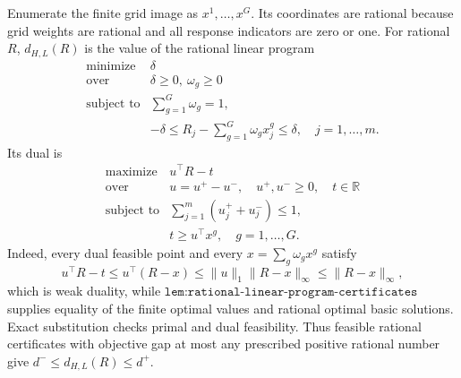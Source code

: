 Enumerate the finite grid image as \(x^1,\ldots,x^G\).  Its coordinates are rational because grid weights are rational and all response indicators are zero or one.  For rational \(R\), \(d_{H,L}(R)\) is the value of the rational linear program
\[
 \begin{array}{ll}
 \text{minimize}&\delta\\
 \text{over}&\delta\ge0,\ \omega_g\ge0\\
 \text{subject to}&\displaystyle\sum_{g=1}^G\omega_g=1,\\
 &\displaystyle-\delta\le R_j-\sum_{g=1}^G\omega_gx^g_j\le\delta,
 \quad j=1,\ldots,m.
 \end{array}
\]
Its dual is
\[
 \begin{array}{ll}
 \text{maximize}&u^\top R-t\\
 \text{over}&u=u^+-u^-,\quad u^+,u^-\ge0,\quad t\in\mathbb R\\
 \text{subject to}&\displaystyle\sum_{j=1}^m(u_j^++u_j^-)\le1,\\
 &t\ge u^\top x^g,\quad g=1,\ldots,G.
 \end{array}
\]
Indeed, every dual feasible point and every \(x=\sum_g\omega_gx^g\) satisfy
\[
 u^\top R-t\le u^\top(R-x)
 \le\|u\|_1\|R-x\|_\infty
 \le\|R-x\|_\infty,
\]
which is weak duality, while \(\texttt{lem:rational-linear-program-certificates}\) supplies equality of the finite optimal values and rational optimal basic solutions.  Exact substitution checks primal and dual feasibility.  Thus feasible rational certificates with objective gap at most any prescribed positive rational number give \(d^-\le d_{H,L}(R)\le d^+\).

